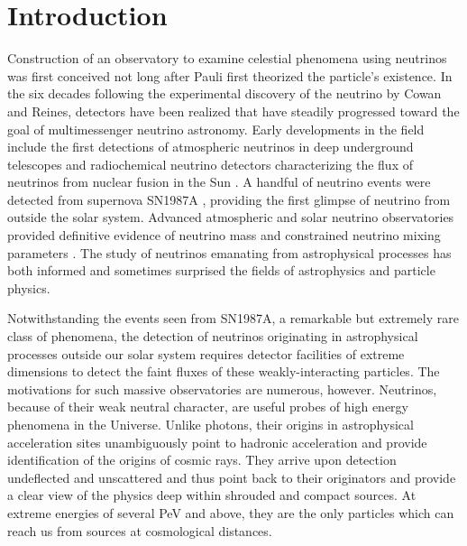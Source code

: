
\section{Introduction}
\label{sec:intro}

Construction of an observatory to examine celestial phenomena using
neutrinos was first conceived not long after Pauli first theorized the
particle's existence.  In the six decades following the experimental
discovery of the neutrino by Cowan and Reines, detectors have been realized
that have steadily progressed toward the goal of multimessenger neutrino
astronomy.  Early developments in the field include the first detections of
atmospheric neutrinos in deep underground telescopes \cite{Witwatersrand,KGF} and
radiochemical neutrino detectors characterizing the flux of neutrinos from
nuclear fusion in the Sun \cite{Homestake, GALLEX}. A handful of neutrino
events were detected from supernova SN1987A
\cite{SK1987A,IMB1987A,BUST1987A}, providing the first glimpse of neutrino
from outside the solar system.  Advanced
atmospheric and solar neutrino observatories provided definitive
evidence of neutrino mass and constrained neutrino mixing
parameters \cite{SK,SNO}.  The study of neutrinos emanating from astrophysical
processes has both informed and sometimes surprised the fields of
astrophysics and particle physics. 

Notwithstanding the events seen from SN1987A, a remarkable but
extremely rare class of phenomena, the detection of neutrinos originating in
astrophysical processes outside our solar system requires detector facilities of
extreme dimensions to detect the faint fluxes of these weakly-interacting
particles.  The motivations for such massive observatories are numerous, however.
Neutrinos, because of their weak neutral character, are useful probes of high
energy phenomena in the Universe. Unlike photons, their origins in astrophysical
acceleration sites unambiguously point to hadronic acceleration and
provide identification of the origins of cosmic rays. They arrive upon detection
undeflected and unscattered and thus point back to their originators and provide
a clear view of the physics deep within shrouded and compact sources. At extreme
energies of several PeV and above, they are the only particles which can reach 
us from sources at cosmological distances.

